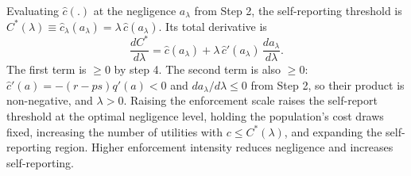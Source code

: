 \documentclass{article}
\begin{document}
	Evaluating $\hat{c}(.)$ at the negligence $a_\lambda$ from Step 2, the self-reporting threshold is $C^*(\lambda) \equiv \hat{c}_\lambda(a_\lambda) = \lambda\,\hat{c}(a_\lambda)$. Its total derivative is
	\[
	\frac{dC^*}{d\lambda} = \hat{c}(a_\lambda) + \lambda\,\hat{c}'(a_\lambda)\,\frac{da_\lambda}{d\lambda}.
	\]
	The first term is $\ge 0$ by step 4. The second term is also $\ge 0$: $\hat{c}'(a) = -(r-ps)q'(a) < 0$ and $da_\lambda/d\lambda \le 0$ from Step 2, so their product is non-negative, and $\lambda>0$. Raising the enforcement scale raises the self-report threshold at the optimal negligence level, holding the population's cost draws fixed, increasing the number of utilities with $c \le C^*(\lambda)$, and expanding the self-reporting region. Higher enforcement intensity reduces negligence and increases self-reporting.
	
	\printbibliography
	
\end{document}
